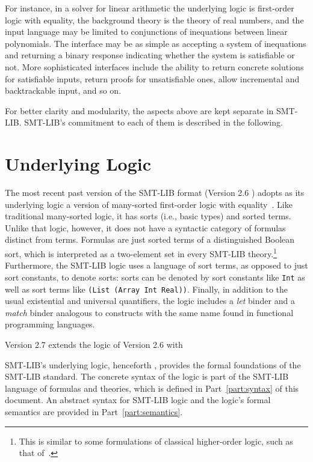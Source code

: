 For instance, in a solver for linear arithmetic
the underlying logic is first-order logic with equality,
the background theory is the theory of real numbers, and
the input language may be limited to conjunctions of inequations 
between linear polynomials.
The interface may be as simple as accepting a system
of inequations and returning a binary response indicating 
whether the system is satisfiable or not.
More sophisticated interfaces include
the ability to return concrete solutions for satisfiable inputs,
return proofs for unsatisfiable ones,
allow incremental and backtrackable input, and so on.

For better clarity and modularity, 
the aspects above are kept separate in SMT-LIB.
SMT-LIB's commitment to each of them is described in the following.


\section{Underlying Logic}


The most recent past version of the SMT-LIB format (Version 2.6 )
adopts as its underlying logic a version of many-sorted first-order logic 
with equality~\cite{Man-MSL-93,Gal-86,Hen-01}.
Like traditional many-sorted logic, it has sorts (i.e., basic types) 
and sorted terms.
Unlike that logic, however,
it does not have a syntactic category of formulas distinct from terms.
Formulas are just sorted terms of a distinguished Boolean sort,
which is interpreted as a two-element set in every SMT-LIB theory.\footnote{This is similar
to some formulations of classical higher-order logic, such as that of~\cite{andrews86}.}
Furthermore, the SMT-LIB logic uses a language of sort terms,
as opposed to just sort constants, to denote sorts:
sorts can be denoted by sort constants like \texttt{Int}
as well as sort terms like
\texttt{(List (Array Int Real))}.
Finally,
in addition to the usual existential and universal quantifiers, 
the logic includes a \emph{let} binder
and a \emph{match} binder
analogous to constructs with the same name
found in functional programming languages.

Version 2.7 extends the logic of Version 2.6 with 


SMT-LIB's underlying logic,
henceforth ,
provides the formal foundations of the SMT-LIB standard.
The concrete syntax of the logic is part of the SMT-LIB language
of formulas and theories, which is defined in Part~\ref{part:syntax} 
of this document.
An abstract syntax for SMT-LIB logic and 
the logic's formal semantics are provided in Part~\ref{part:semantics}.




